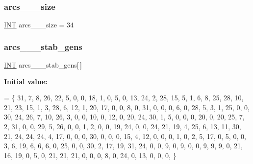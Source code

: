 \subsubsection{\texorpdfstring{arcs\+\_\+\_\+\_\+size}{arcs\_32\_34\_size}}
{\footnotesize\ttfamily \mbox{\hyperlink{galois_8h_a09fddde158a3a20bd2dcadb609de11dc}{I\+NT}} arcs\+\_\+\_\+\_\+size = 34}

\mbox{\label{data__hyperovals_8_c_a25e6977c31325692de292c8b8c9d3fbe}} 
\subsubsection{\texorpdfstring{arcs\+\_\+\_\+\_\+stab\+\_\+gens}{arcs\_32\_34\_stab\_gens}}
{\footnotesize\ttfamily \mbox{\hyperlink{galois_8h_a09fddde158a3a20bd2dcadb609de11dc}{I\+NT}} arcs\+\_\+\_\+\_\+stab\+\_\+gens\mbox{[}$\,$\mbox{]}}

{\bfseries Initial value\+:}
\begin{DoxyCode}
= \{
31,  7,  8, 26, 22,  5,  0,  0, 18, 1, 
 0,  5,  0, 13, 24,  2, 28, 15,  5, 1, 
 6,  8, 25, 28, 10, 21, 23, 15,  1, 3, 
28,  6, 12,  1, 20, 17,  0,  0,  8, 0, 
31,  0,  0,  0,  6,  0, 28,  5,  3, 1, 
25,  0,  0, 30, 24, 26,  7, 10, 26, 3, 
 0,  0, 10,  0, 12,  0, 20, 24, 30, 1, 
 5,  0,  0,  0, 20,  0, 20, 25,  7, 2, 
31,  0,  0, 29,  5, 26,  0,  0,  1, 2, 
 0,  0, 19, 24,  0,  0, 24, 21, 19, 4, 
25,  6, 13, 11, 30, 21, 24, 24, 24, 4, 
17,  0,  0,  0, 30,  0,  0,  0, 15, 4, 
12,  0,  0,  0,  1,  0,  2,  5, 17, 0, 
 5,  0,  0,  3,  6, 19,  6,  6,  6, 0, 
25,  0,  0, 30,  2, 17, 19, 31, 24, 0, 
 0,  9,  0,  9,  0,  0,  9,  9,  9, 0, 
21, 16, 19,  0,  5,  0, 21, 21, 21, 0, 
 0,  0,  8,  0, 24,  0, 13,  0,  0, 0, 
\}
\end{DoxyCode}
\mbox{\label{data__hyperovals_8_c_a58232aa603daa8dfb0c7892e1ab44d8d}} 

